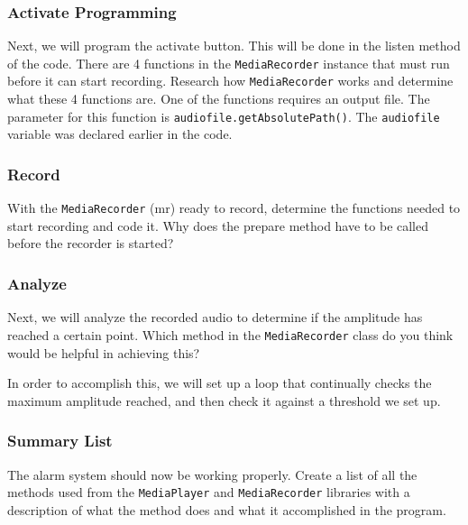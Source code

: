 \subsubsection{Activate Programming}
Next, we will program the activate button. This will be done in the listen method of the code. There are 4 functions in the \verb=MediaRecorder= instance that must run before it can start recording. Research how \verb=MediaRecorder= works and determine what these 4 functions are. One of the functions requires an output file. The parameter for this function is \verb=audiofile.getAbsolutePath()=. The \verb=audiofile= variable was declared earlier in the code. 

\subsubsection{Record}
With the \verb=MediaRecorder= (mr) ready to record, determine the functions needed to start recording and code it. Why does the prepare method have to be called before the recorder is started?

\subsubsection{Analyze}
Next, we will analyze the recorded audio to determine if the amplitude has reached a certain point. Which method in the \verb=MediaRecorder= class do you think would be helpful in achieving this?

In order to accomplish this, we will set up a loop that continually checks the maximum amplitude reached, and then check it against a threshold we set up.

\subsubsection{Summary List}
The alarm system should now be working properly. Create a list of all the methods used from the \verb=MediaPlayer= and \verb=MediaRecorder= libraries with a description of what the method does and what it accomplished in the program.
